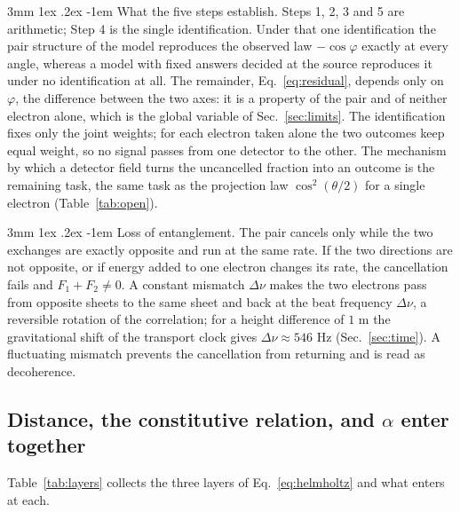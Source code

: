 \documentclass[%
 reprint, amsmath,amssymb, aps, prb, ]{revtex4-2}
\makeatletter
\numberwithin{equation}{section}
\renewcommand\paragraph{%
  \@startsection{paragraph}{4}{\z@}%
    {3mm \@plus 1ex \@minus .2ex}
    {-1em}
    {\normalfont\normalsize\itshape}}
\makeatother
\begin{document}
\paragraph{What the five steps establish.} Steps 1, 2, 3 and 5 are arithmetic; Step 4 is the single identification. Under that one identification the pair structure of the model reproduces the observed law $-\cos\varphi$ exactly at every angle, whereas a model with fixed answers decided at the source reproduces it under no identification at all. The remainder, Eq.~\eqref{eq:residual}, depends only on $\varphi$, the difference between the two axes: it is a property of the pair and of neither electron alone, which is the global variable of Sec.~\ref{sec:limits}. The identification fixes only the joint weights; for each electron taken alone the two outcomes keep equal weight, so no signal passes from one detector to the other. The mechanism by which a detector field turns the uncancelled fraction into an outcome is the remaining task, the same task as the projection law $\cos^2(\theta/2)$ for a single electron (Table~\ref{tab:open}).

\paragraph{Loss of entanglement.} The pair cancels only while the two exchanges are exactly opposite and run at the same rate. If the two directions are not opposite, or if energy added to one electron changes its rate, the cancellation fails and $F_1+F_2\neq0$. A constant mismatch $\Delta\nu$ makes the two electrons pass from opposite sheets to the same sheet and back at the beat frequency $\Delta\nu$, a reversible rotation of the correlation; for a height difference of $1$ m the gravitational shift of the transport clock gives $\Delta\nu\approx546$ Hz (Sec.~\ref{sec:time}). A fluctuating mismatch prevents the cancellation from returning and is read as decoherence.

\subsection{Distance, the constitutive relation, and $\alpha$ enter together}

Table~\ref{tab:layers} collects the three layers of Eq.~\eqref{eq:helmholtz} and what enters at each.
\end{document}
